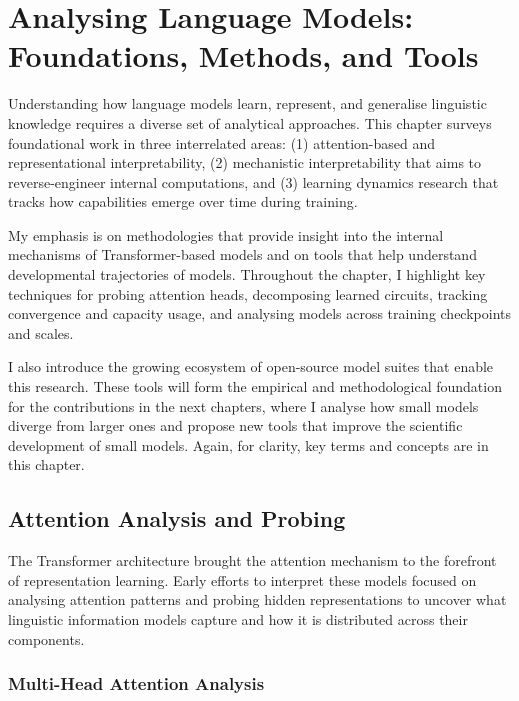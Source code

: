 \chapter{Analysing Language Models: Foundations, Methods, and Tools}
\label{chapter:analysis-background}

Understanding how language models learn, represent, and generalise linguistic knowledge requires a diverse set of analytical approaches. This chapter surveys foundational work in three interrelated areas: (1) attention-based and representational interpretability, (2) mechanistic interpretability that aims to reverse-engineer internal computations, and (3) learning dynamics research that tracks how capabilities emerge over time during training. 

My emphasis is on methodologies that provide insight into the internal mechanisms of Transformer-based models and on tools that help understand developmental trajectories of models. Throughout the chapter, I highlight key techniques for probing attention heads, decomposing learned circuits, tracking convergence and capacity usage, and analysing models across training checkpoints and scales.

I also introduce the growing ecosystem of open-source model suites that enable this research. These tools will form the empirical and methodological foundation for the contributions in the next chapters, where I analyse how small models diverge from larger ones and propose new tools that improve the scientific development of small models. Again, for clarity, key terms and concepts are  in this chapter.

\section{Attention Analysis and Probing}

The Transformer architecture \citep{vaswani2017attention} brought the attention mechanism to the forefront of representation learning. Early efforts to interpret these models focused on analysing attention patterns and probing hidden representations to uncover what linguistic information models capture and how it is distributed across their components.

\subsection{Multi-Head Attention Analysis}

